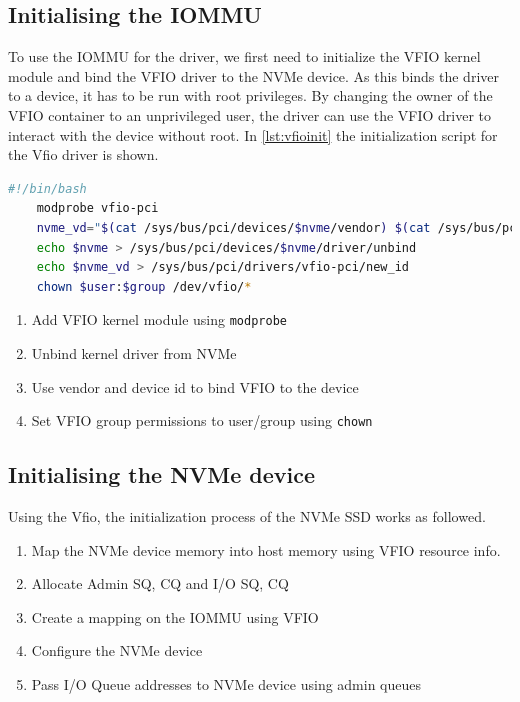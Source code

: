 \subsection{Initialising the IOMMU}

To use the IOMMU for the driver, we first need to initialize the VFIO kernel module and bind the VFIO driver to the NVMe device.
As this binds the driver to a device, it has to be run with root privileges.
By changing the owner of the VFIO container to an unprivileged user, the driver can use the VFIO driver to interact with the device without root.
In \autoref{lst:vfioinit} the initialization script for the Vfio driver is shown.

\begin{lstlisting}[language=bash,caption={Initializing VFIO using bash}, label=lst:vfioinit, frame=single]
    #!/bin/bash
    modprobe vfio-pci
    nvme_vd="$(cat /sys/bus/pci/devices/$nvme/vendor) $(cat /sys/bus/pci/devices/$nvme/device)"
    echo $nvme > /sys/bus/pci/devices/$nvme/driver/unbind
    echo $nvme_vd > /sys/bus/pci/drivers/vfio-pci/new_id
    chown $user:$group /dev/vfio/*     
\end{lstlisting}

\begin{enumerate}
    \item Add VFIO kernel module using \texttt{modprobe}
    \item Unbind kernel driver from NVMe
    \item Use vendor and device id to bind VFIO to the device
    \item Set VFIO group permissions to user/group using \texttt{chown}
\end{enumerate}

\subsection{Initialising the NVMe device}
Using the Vfio, the initialization process of the NVMe SSD works as followed.

\begin{enumerate}
    \item Map the NVMe device memory into host memory using VFIO resource info.
    \item Allocate Admin SQ, CQ and I/O SQ, CQ
    \item Create a mapping on the IOMMU using VFIO
    \item Configure the NVMe device
    \item Pass I/O Queue addresses to NVMe device using admin queues
\end{enumerate}

